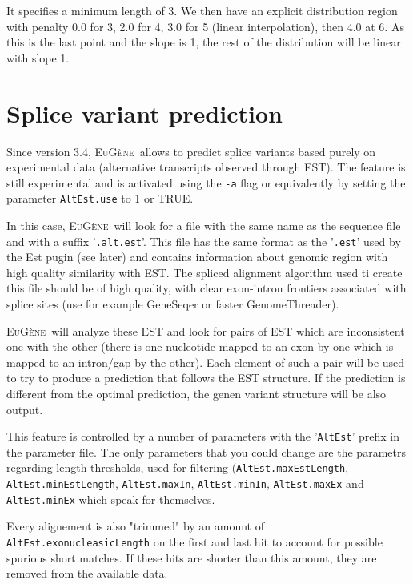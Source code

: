\documentclass[a4paper,titlepage]{report}
\newcommand{\EuGene}{\textsc{EuG\`ene}}
\begin{document}
It specifies a minimum length of 3. We then have an explicit
distribution region with penalty 0.0 for 3, 2.0 for 4, 3.0 for 5
(linear interpolation), then 4.0 at 6. As this is the last point
and the slope is 1, the rest of the distribution will be linear
with slope 1.

\section{Splice variant prediction}

Since version 3.4, \EuGene\ allows to predict splice variants based purely on
experimental data (alternative transcripts observed through EST). The feature
is still experimental and is activated using the \texttt{-a} flag or 
equivalently by setting the parameter \texttt{AltEst.use} to 1 or TRUE.

In this case, \EuGene\ will look for a file with the same name as the sequence
file and with a suffix '\texttt{.alt.est}'. This file has the same format as
the '\texttt{.est}' used by the Est pugin (see later) and contains information
about genomic region with high quality similarity with EST. The spliced 
alignment algorithm used ti create this file should be of high quality, 
with clear exon-intron frontiers associated with splice sites (use for example
GeneSeqer or faster GenomeThreader).

\EuGene\ will analyze these EST and look for pairs of EST which are inconsistent
one with the other (there is one nucleotide mapped to an exon by one which is 
mapped to an intron/gap by the other). Each element of such a pair will be used 
to try to produce a prediction that follows the EST structure. If the prediction
is different from the optimal prediction, the genen variant structure will be
also output.

This feature is controlled by a number of parameters with the '\texttt{AltEst}'
prefix in the parameter file. The only parameters that you could change are the
parametrs regarding length thresholds, used for filtering (\texttt{AltEst.maxEstLength}, \texttt{AltEst.minEstLength}, \texttt{AltEst.maxIn}, \texttt{AltEst.minIn}, \texttt{AltEst.maxEx} and \texttt{AltEst.minEx} which speak for themselves.

Every alignement is also "trimmed" by an amount of \texttt{AltEst.exonucleasicLength} on the first and last hit to account for possible spurious short matches. If these hits are shorter than this amount, they are removed from the available data.
\end{document}
